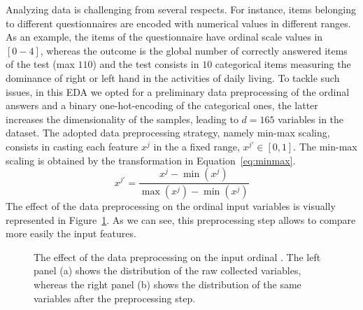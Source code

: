 Analyzing \PCO data is challenging from several respects.
For instance, items belonging to different questionnaires are encoded with numerical values in different ranges.
As an example, the items of the \MFIS questionnaire have ordinal scale values in $[0-4]$, whereas the \SDMT outcome is the global number of correctly answered items of the test (max $110$) and the \EDINB test consists in $10$ categorical items measuring the dominance of right or left hand in the activities of daily living.
To tackle such issues, in this EDA we opted for a preliminary data preprocessing of the ordinal answers and a binary one-hot-encoding of the categorical ones, the latter increases the dimensionality of the samples, leading to $d=165$ variables in the dataset.
The adopted data preprocessing strategy, namely min-max scaling, consists in casting each feature $x^j$ in the a fixed range, \ie $x^{j'} \in [0, 1]$. The min-max scaling is obtained by the transformation in Equation~\eqref{eq:minmax}.
\begin{equation} \label{eq:minmax}
	x^{j'} = \frac{x^j - \min(x^j)}{\max(x^j) - \min(x^j)}
\end{equation}
The effect of the data preprocessing on the ordinal input variables is visually represented in Figure~\ref{fig:ms_boxplots}. As we can see, this preprocessing step allows to compare more easily the input features.

\begin{figure}[]
	\centering
	\caption{The effect of the data preprocessing on the input ordinal \PCOs. The left panel (a) shows the distribution of the raw collected variables, whereas the right panel (b) shows the distribution of the same variables after the preprocessing step.}\label{fig:ms_boxplots}
\end{figure}

